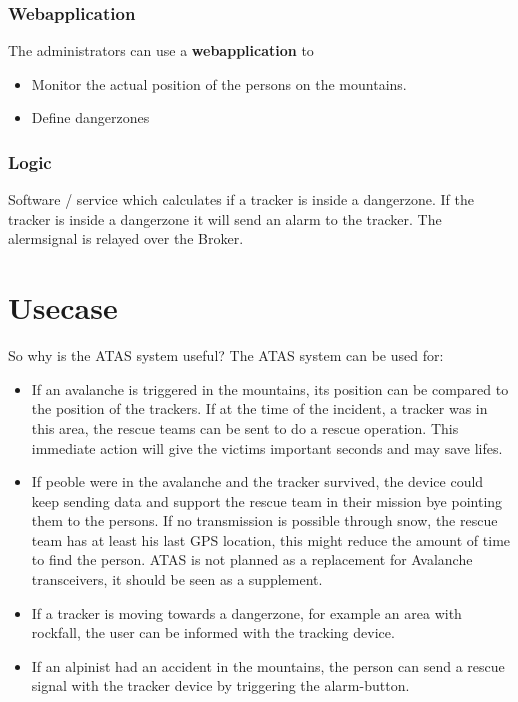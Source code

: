\documentclass[a4paper,11pt, oneside]{report}
\theoremstyle{definition}
\begin{document}
\subsubsection{Webapplication}
The administrators can use a  \textbf{webapplication} to 
\begin{itemize}
\item
Monitor the actual position of the persons on the mountains. 
\item
Define dangerzones
\end{itemize}

\subsubsection{Logic}
Software / service which calculates if a tracker is inside a dangerzone. If the tracker is inside a dangerzone it will send an alarm to the tracker. The alermsignal is relayed over the Broker.

\section{Usecase}
So why is the ATAS system useful?
The ATAS system can be used for:
\begin{itemize}
\item If an avalanche is triggered in the mountains, its position can be compared to the position of the trackers.
If at the time of the incident, a tracker was in this area, the rescue teams can be sent to do a rescue operation. This immediate action will give the victims important seconds and may save lifes.
\item If peoble were in the avalanche and the tracker survived, the device could keep sending data and support the rescue team in their mission bye pointing them to the persons. If no transmission is possible through snow, the rescue team has at least his last GPS location, this might reduce the amount of time to find the person. ATAS is not planned as a replacement for Avalanche transceivers, it should be seen as a supplement.
\item
If a tracker is moving towards a dangerzone, for example an area with rockfall, the user can be informed with the tracking device.
\item If an alpinist had an accident in the mountains, the person can send a rescue signal with the tracker device by triggering the alarm-button.
\end{itemize}

\end{document}

